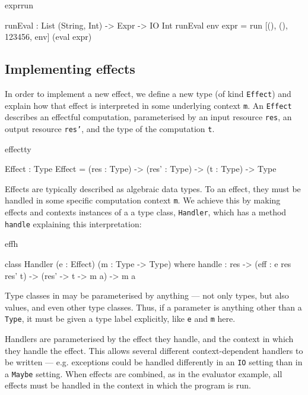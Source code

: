 \begin{SaveVerbatim}{exprrun}

runEval : List (String, Int) -> Expr -> IO Int
runEval env expr 
    = run [(), (), 123456, env] (eval expr)

\end{SaveVerbatim}
\subsection{Implementing effects}

In order to implement a new effect, we define a new type (of kind \texttt{Effect})
and explain how that effect is interpreted in some underlying context
\texttt{m}. An \texttt{Effect} describes an effectful computation,
parameterised by an input resource \texttt{res}, an output resource \texttt{res'}, 
and the type of the computation \texttt{t}.

\begin{SaveVerbatim}{effectty}

Effect : Type
Effect = (res : Type) -> (res' : Type) -> 
         (t : Type) -> Type

\end{SaveVerbatim}

\noindent
Effects are typically described as algebraic data types. To  an
effect, they must be handled in some specific computation context \texttt{m}.
We achieve this by making effects and contexts instances of a a type class,
\texttt{Handler}, which has a method \texttt{handle} explaining this
interpretation:

\begin{SaveVerbatim}{effh}

class Handler (e : Effect) (m : Type -> Type) where
     handle : res -> (eff : e res res' t) -> 
              (res' -> t -> m a) -> m a

\end{SaveVerbatim}

\noindent
Type classes in \Idris{} may be parameterised by anything --- not only types,
but also values, and even other type classes. Thus, if a parameter is anything
other than a \texttt{Type}, it must be given a type label explicitly, like
\texttt{e} and \texttt{m} here.

Handlers are parameterised by the effect they handle, and the context in which
they handle the effect. This allows several different context-dependent
handlers to be written --- e.g. exceptions could be handled differently in an
\texttt{IO} setting than in a \texttt{Maybe} setting. When effects are combined,
as in the evaluator example, all effects must be handled
in the context in which the program is run.

